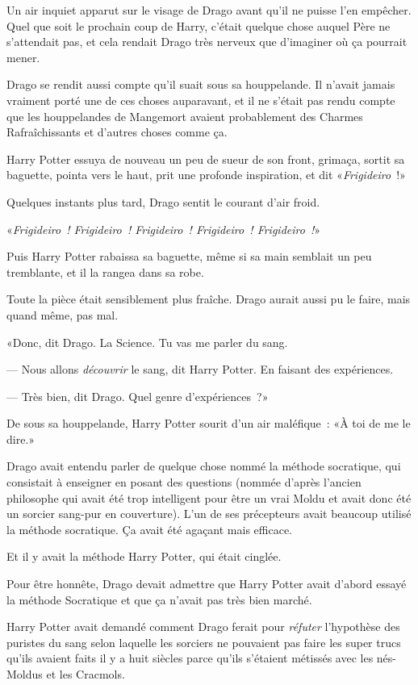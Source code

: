 Un air inquiet apparut sur le visage de Drago avant qu'il ne puisse l'en empêcher. Quel que soit le prochain coup de Harry, c'était quelque chose auquel Père ne s'attendait pas, et cela rendait Drago très nerveux que d'imaginer où ça pourrait mener.

Drago se rendit aussi compte qu'il suait sous sa houppelande. Il n'avait jamais vraiment porté une de ces choses auparavant, et il ne s'était pas rendu compte que les houppelandes de Mangemort avaient probablement des Charmes Rafraîchissants et d'autres choses comme ça.

Harry Potter essuya de nouveau un peu de sueur de son front, grimaça, sortit sa baguette, pointa vers le haut, prit une profonde inspiration, et dit «\emph{Frigideiro}~!»

Quelques instants plus tard, Drago sentit le courant d'air froid.

«\emph{Frigideiro~! Frigideiro~! Frigideiro~! Frigideiro~! Frigideiro~!}»

Puis Harry Potter rabaissa sa baguette, même si sa main semblait un peu tremblante, et il la rangea dans sa robe.

Toute la pièce était sensiblement plus fraîche. Drago aurait aussi pu le faire, mais quand même, pas mal.

«Donc, dit Drago. La Science. Tu vas me parler du sang.

--- Nous allons \emph{découvrir} le sang, dit Harry Potter. En faisant des expériences.

--- Très bien, dit Drago. Quel genre d'expériences~?»

De sous sa houppelande, Harry Potter sourit d'un air maléfique~: «À toi de me le dire.»

\later

Drago avait entendu parler de quelque chose nommé la méthode socratique, qui consistait à enseigner en posant des questions (nommée d'après l'ancien philosophe qui avait été trop intelligent pour être un vrai Moldu et avait donc été un sorcier sang-pur en couverture). L'un de ses précepteurs avait beaucoup utilisé la méthode socratique. Ça avait été agaçant mais efficace.

Et il y avait la méthode Harry Potter, qui était cinglée.

Pour être honnête, Drago devait admettre que Harry Potter avait d'abord essayé la méthode Socratique et que ça n'avait pas très bien marché.

Harry Potter avait demandé comment Drago ferait pour \emph{réfuter} l'hypothèse des puristes du sang selon laquelle les sorciers ne pouvaient pas faire les super trucs qu'ils avaient faits il y a huit siècles parce qu'ils s'étaient métissés avec les nés-Moldus et les Cracmols.

